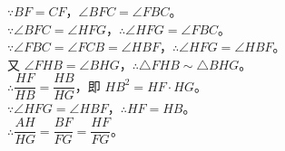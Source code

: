\documentclass{exam-zh}
\begin{document}
\begin{problem}[points=12]
\begin{solutionblock}
{$\because BF=CF$，$\angle BFC=\angle FBC$。 \\
$\because \angle BFC=\angle HFG$，$\therefore \angle HFG=\angle FBC$。 \\
$\because \angle FBC=\angle FCB=\angle HBF$，$\therefore \angle HFG=\angle HBF$。 \\
又 $\angle FHB=\angle BHG$，$\therefore \triangle FHB\sim\triangle BHG$。 \\
$\therefore \dfrac{HF}{HB}=\dfrac{HB}{HG}$，即 $HB^2=HF\cdot HG$。 \\
$\because \angle HFG=\angle HBF$，$\therefore HF=HB$。 \\
$\therefore \dfrac{AH}{HG}=\dfrac{BF}{FG}=\dfrac{HF}{FG}$。
}
  \end{solutionblock}
\end{problem}
\end{document}
